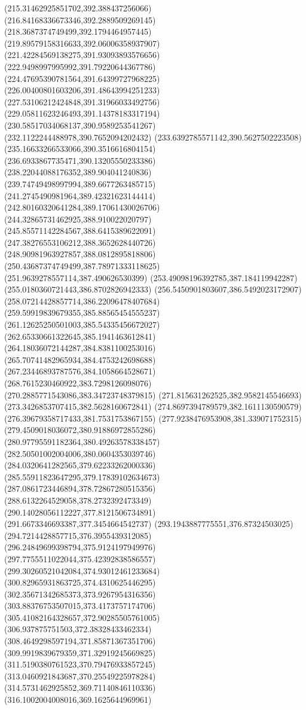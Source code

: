 {(215.31462925851702,392.388437256066)
(216.84168336673346,392.2889509269145)
(218.3687374749499,392.1794464957445)
(219.89579158316633,392.06006358937907)
(221.42284569138275,391.93093893576656)
(222.9498997995992,391.79220644367786)
(224.47695390781564,391.64399727968225)
(226.00400801603206,391.48643994251233)
(227.53106212424848,391.31966033492756)
(229.05811623246493,391.14378183317194)
(230.58517034068137,390.9589253541267)
(232.1122244488978,390.7652094202432)
(233.6392785571142,390.5627502223508)
(235.16633266533066,390.3516616804154)
(236.6933867735471,390.13205550233386)
(238.22044088176352,389.904041240836)
(239.74749498997994,389.6677263485715)
(241.2745490981964,389.42321623144414)
(242.80160320641284,389.17061430026706)
(244.32865731462925,388.910022020797)
(245.85571142284567,388.6415389622091)
(247.38276553106212,388.3652628440726)
(248.90981963927857,388.0812895818806)
(250.43687374749499,387.78971333118625)
(251.9639278557114,387.490626530399)
(253.49098196392785,387.184119942287)
(255.0180360721443,386.8702826942333)
(256.5450901803607,386.5492023172907)
(258.07214428857714,386.22096478407684)
(259.59919839679355,385.88565454555237)
(261.12625250501003,385.54335456672027)
(262.65330661322645,385.1941463612841)
(264.18036072144287,384.8381100253016)
(265.70741482965934,384.4753242698688)
(267.23446893787576,384.1058664528671)
(268.7615230460922,383.7298126098076)
(270.2885771543086,383.34723748379815)
(271.815631262525,382.9582145546693)
(273.3426853707415,382.5628160672841)
(274.8697394789579,382.1611130590579)
(276.39679358717433,381.7531753867155)
(277.9238476953908,381.339071752315)
(279.4509018036072,380.91886972855286)
(280.97795591182364,380.49263578338457)
(282.50501002004006,380.0604353039746)
(284.0320641282565,379.62233262000336)
(285.55911823647295,379.17839102634673)
(287.0861723446894,378.72867280515356)
(288.6132264529058,378.2732392473349)
(290.14028056112227,377.8121506734891)
(291.6673346693387,377.3454664542737)
(293.1943887775551,376.87324503025)
(294.7214428857715,376.3955439312085)
(296.24849699398794,375.9124197949976)
(297.7755511022044,375.42392838586557)
(299.30260521042084,374.93012461233684)
(300.82965931863725,374.4310625446295)
(302.35671342685373,373.9267954316356)
(303.88376753507015,373.4173757174706)
(305.41082164328657,372.90285505761005)
(306.937875751503,372.38328433462334)
(308.4649298597194,371.85871367351706)
(309.9919839679359,371.32919245669825)
(311.5190380761523,370.79476933857245)
(313.0460921843687,370.25549225978284)
(314.5731462925852,369.71140846110336)
(316.1002004008016,369.1625644969961)
}

